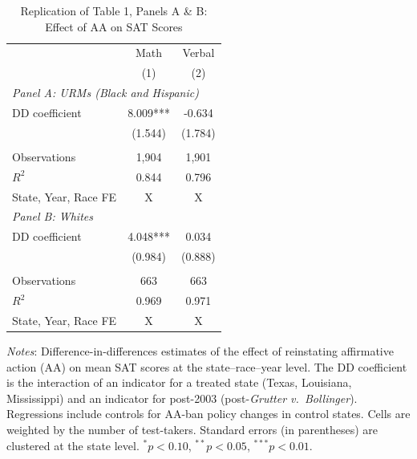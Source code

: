 \begin{table}[h]
\centering
\caption{Replication of Table 1, Panels A \& B: Effect of AA on SAT Scores}
\label{tab:table1_ab}
\small
\begin{tabular}{lcc}
\toprule
 & Math & Verbal \\
 & (1)  & (2)    \\
\midrule
\multicolumn{3}{l}{\textit{Panel A: URMs (Black and Hispanic)}} \\[4pt]
DD coefficient & 8.009*** & -0.634 \\
               & (1.544)   & (1.784)   \\
\\[-2pt]
Observations   & 1,904 & 1,901 \\
$R^2$          & 0.844 & 0.796 \\
State, Year, Race FE & X & X \\
\midrule
\multicolumn{3}{l}{\textit{Panel B: Whites}} \\[4pt]
DD coefficient & 4.048*** & 0.034 \\
               & (0.984)   & (0.888)   \\
\\[-2pt]
Observations   & 663 & 663 \\
$R^2$          & 0.969 & 0.971 \\
State, Year, Race FE & X & X \\
\bottomrule
\end{tabular}
\begin{minipage}{\linewidth}
\smallskip
\footnotesize
\textit{Notes}: Difference-in-differences estimates of the effect of reinstating
affirmative action (AA) on mean SAT scores at the state--race--year level.
The DD coefficient is the interaction of an indicator for a treated state
(Texas, Louisiana, Mississippi) and an indicator for post-2003
(post-\textit{Grutter v.\ Bollinger}). Regressions include controls for
AA-ban policy changes in control states. Cells are weighted by the number
of test-takers. Standard errors (in parentheses) are clustered at the
state level. $^{*}p<0.10$, $^{**}p<0.05$, $^{***}p<0.01$.
\end{minipage}
\end{table}
